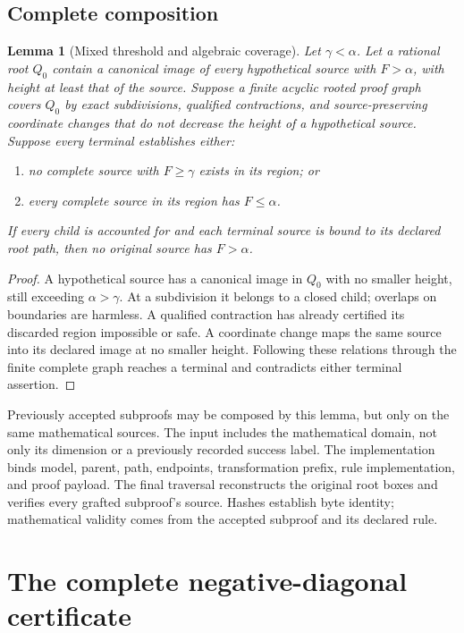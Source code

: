 \documentclass[11pt,reqno]{amsart}
\newtheorem{lemma}[theorem]{Lemma}
\theoremstyle{definition}
\theoremstyle{remark}
\newcommand{\gam}{\gamma}
\begin{document}
\subsection{Complete composition}
\begin{lemma}[Mixed threshold and algebraic coverage]\label{lem:mixed}
Let \(\gam<\alpha\). Let a rational root \(Q_0\) contain a canonical
image of every hypothetical source with \(F>\alpha\), with
height at least that of the source.
Suppose a finite acyclic rooted proof graph covers \(Q_0\) by exact
subdivisions, qualified contractions, and source-preserving coordinate
changes that do not decrease the height of a hypothetical source.
Suppose every terminal establishes either:
\begin{enumerate}
\item no complete source with \(F\ge\gam\) exists in its region; or
\item every complete source in its region has \(F\le\alpha\).
\end{enumerate}
If every child is accounted for and each terminal source is bound
to its declared root path, then no original source has \(F>\alpha\).
\end{lemma}
\begin{proof}
A hypothetical source has a canonical image in \(Q_0\) with no
smaller height, still exceeding \(\alpha>\gam\).
At a subdivision it belongs to a closed child; overlaps on boundaries
are harmless. A qualified contraction has already certified its
discarded region impossible or safe. A coordinate change maps the
same source into its declared image at no smaller height.
Following these relations through the finite complete graph reaches
a terminal and contradicts either terminal assertion.
\end{proof}

Previously accepted subproofs may be composed by this lemma, but only
on the same mathematical sources. The input includes the mathematical domain, not only its dimension
or a previously recorded success label. The implementation binds model,
parent, path, endpoints, transformation prefix, rule implementation,
and proof payload. The final traversal reconstructs the original
root boxes and verifies every grafted subproof's source.
Hashes establish byte identity; mathematical validity comes from
the accepted subproof and its declared rule.

\section{The complete negative-diagonal certificate}\label{sec:Bcomplete}
\end{document}
